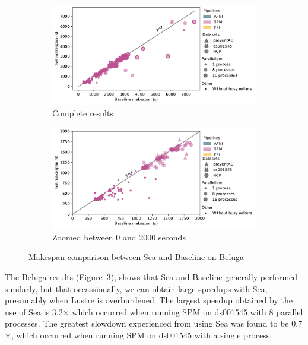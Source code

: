 \begin{figure}

\begin{subfigure}{\textwidth}
    \centering
    \captionsetup{width=.85\linewidth}
    \includegraphics[width=\columnwidth]{figures/sea-neuro/beluga_sea_all.pdf}%
    \caption{Complete results}\label{fig:seaneuro:belugafull}
\end{subfigure}
\begin{subfigure}{\textwidth}
    \centering
    \captionsetup{width=.85\linewidth}
    \includegraphics[width=\linewidth]{figures/sea-neuro/beluga_sea_zoom.pdf}
    \caption{Zoomed between 0 and 2000 seconds}\label{fig:seaneuro:belugazoom}
\end{subfigure}
\caption{Makespan comparison between Sea and Baseline on Beluga}
\label{fig:seaneuro:beluga}
\end{figure}

The Beluga results (Figure~\ref{fig:seaneuro:beluga}), 
shows that Sea and Baseline generally performed 
similarly, but that occassionally, we can obtain large 
speedups with Sea, presumably when Lustre is 
overburdened. The largest speedup obtained by the use of
Sea is 3.2$\times$ which occurred when running SPM on ds001545 with 8 parallel processes. The greatest
slowdown experienced from using Sea was found to be 0.7$\times$, which occurred when running SPM on ds001545 with a single process. 

